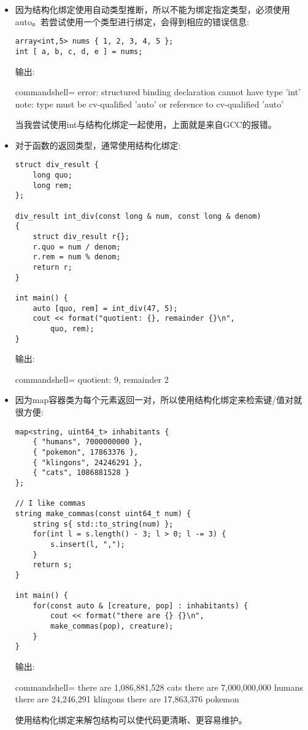 \begin{itemize}
\item 
因为结构化绑定使用自动类型推断，所以不能为绑定指定类型，必须使用auto。若尝试使用一个类型进行绑定，会得到相应的错误信息:

\begin{lstlisting}[style=styleCXX]
array<int,5> nums { 1, 2, 3, 4, 5 };
int [ a, b, c, d, e ] = nums;
\end{lstlisting}

输出:

\begin{tcblisting}{commandshell={}}
error: structured binding declaration cannot have type 'int'
note: type must be cv-qualified 'auto' or reference to
cv-qualified 'auto'
\end{tcblisting}

当我尝试使用int与结构化绑定一起使用，上面就是来自GCC的报错。

\item 
对于函数的返回类型，通常使用结构化绑定:

\begin{lstlisting}[style=styleCXX]
struct div_result {
	long quo;
	long rem;
};

div_result int_div(const long & num, const long & denom)
{
	struct div_result r{};
	r.quo = num / denom;
	r.rem = num % denom;
	return r;
}

int main() {
	auto [quo, rem] = int_div(47, 5);
	cout << format("quotient: {}, remainder {}\n",
		quo, rem);
}
\end{lstlisting}

输出:

\begin{tcblisting}{commandshell={}}
quotient: 9, remainder 2
\end{tcblisting}

\item 
因为map容器类为每个元素返回一对，所以使用结构化绑定来检索键/值对就很方便:

\begin{lstlisting}[style=styleCXX]
map<string, uint64_t> inhabitants {
	{ "humans", 7000000000 },
	{ "pokemon", 17863376 },
	{ "klingons", 24246291 },
	{ "cats", 1086881528 }
};

// I like commas
string make_commas(const uint64_t num) {
	string s{ std::to_string(num) };
	for(int l = s.length() - 3; l > 0; l -= 3) {
		s.insert(l, ",");
	}
	return s;
}

int main() {
	for(const auto & [creature, pop] : inhabitants) {
		cout << format("there are {} {}\n",
		make_commas(pop), creature);
	}
}
\end{lstlisting}

输出:

\begin{tcblisting}{commandshell={}}
there are 1,086,881,528 cats
there are 7,000,000,000 humans
there are 24,246,291 klingons
there are 17,863,376 pokemon
\end{tcblisting}

使用结构化绑定来解包结构可以使代码更清晰、更容易维护。
\end{itemize}












